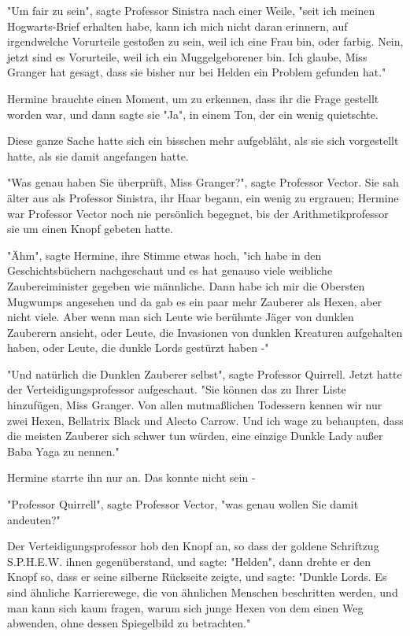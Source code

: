 {"Um fair zu sein", sagte Professor Sinistra nach einer Weile, "seit ich meinen Hogwarts-Brief erhalten habe, kann ich mich nicht daran erinnern, auf irgendwelche Vorurteile gestoßen zu sein, weil ich eine Frau bin, oder farbig. Nein, jetzt sind es Vorurteile, weil ich ein Muggelgeborener bin. Ich glaube, Miss Granger hat gesagt, dass sie bisher nur bei Helden ein Problem gefunden hat."

Hermine brauchte einen Moment, um zu erkennen, dass ihr die Frage gestellt worden war, und dann sagte sie "Ja", in einem Ton, der ein wenig quietschte.

Diese ganze Sache hatte sich ein bisschen mehr aufgebläht, als sie sich vorgestellt hatte, als sie damit angefangen hatte.

"Was genau haben Sie überprüft, Miss Granger?", sagte Professor Vector. Sie sah älter aus als Professor Sinistra, ihr Haar begann, ein wenig zu ergrauen; Hermine war Professor Vector noch nie persönlich begegnet, bis der Arithmetikprofessor sie um einen Knopf gebeten hatte.

"Ähm", sagte Hermine, ihre Stimme etwas hoch, "ich habe in den Geschichtsbüchern nachgeschaut und es hat genauso viele weibliche Zaubereiminister gegeben wie männliche. Dann habe ich mir die Obersten Mugwumps angesehen und da gab es ein paar mehr Zauberer als Hexen, aber nicht viele. Aber wenn man sich Leute wie berühmte Jäger von dunklen Zauberern ansieht, oder Leute, die Invasionen von dunklen Kreaturen aufgehalten haben, oder Leute, die dunkle Lords gestürzt haben -"

"Und natürlich die Dunklen Zauberer selbst", sagte Professor Quirrell. Jetzt hatte der Verteidigungsprofessor aufgeschaut. "Sie können das zu Ihrer Liste hinzufügen, Miss Granger. Von allen mutmaßlichen Todessern kennen wir nur zwei Hexen, Bellatrix Black und Alecto Carrow. Und ich wage zu behaupten, dass die meisten Zauberer sich schwer tun würden, eine einzige Dunkle Lady außer Baba Yaga zu nennen."

Hermine starrte ihn nur an. Das konnte nicht sein -

"Professor Quirrell", sagte Professor Vector, "was genau wollen Sie damit andeuten?"

Der Verteidigungsprofessor hob den Knopf an, so dass der goldene Schriftzug S.P.H.E.W. ihnen gegenüberstand, und sagte: "Helden", dann drehte er den Knopf so, dass er seine silberne Rückseite zeigte, und sagte: "Dunkle Lords. Es sind ähnliche Karrierewege, die von ähnlichen Menschen beschritten werden, und man kann sich kaum fragen, warum sich junge Hexen von dem einen Weg abwenden, ohne dessen Spiegelbild zu betrachten."

}
